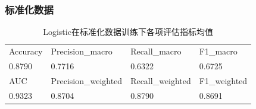 \documentclass[10pt]{article}
\begin{document}
\subsubsection*{标准化数据}
\begin{table}[H]
  \centering
  \caption{Logistic在标准化数据训练下各项评估指标均值}
  \begin{tabular}{llll}
  \toprule
  Accuracy & Precision\_macro & Recall\_macro & F1\_macro \\
  0.8790 & 0.7716 & 0.6322 & 0.6725 \\
  \midrule
  AUC & Precision\_weighted & Recall\_weighted & F1\_weighted \\
  0.9323 & 0.8704 & 0.8790 & 0.8691 \\
  \bottomrule
  \end{tabular}
\end{table}
\end{document}

